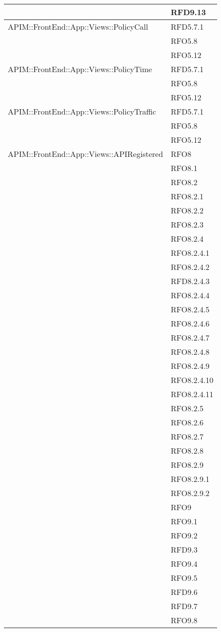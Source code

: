 \begin{longtable}{ p{12cm} | p{4cm} }
	& RFD9.13 \\
	\hline
	APIM::FrontEnd::App::Views::PolicyCall
	& RFD5.7.1 \\
	& RFO5.8 \\
	& RFO5.12 \\
	\hline
	APIM::FrontEnd::App::Views::PolicyTime
	& RFD5.7.1 \\
	& RFO5.8 \\
	& RFO5.12 \\
	\hline
	APIM::FrontEnd::App::Views::PolicyTraffic
	& RFD5.7.1 \\
	& RFO5.8 \\
	& RFO5.12 \\
	\hline
	APIM::FrontEnd::App::Views::APIRegistered
	& RFO8 \\
	& RFO8.1 \\
	& RFO8.2 \\
	& RFO8.2.1 \\
	& RFO8.2.2 \\
	& RFO8.2.3 \\
	& RFO8.2.4 \\
	& RFO8.2.4.1 \\
	& RFO8.2.4.2 \\
	& RFD8.2.4.3 \\
	& RFO8.2.4.4 \\
	& RFO8.2.4.5 \\
	& RFO8.2.4.6 \\
	& RFO8.2.4.7 \\
	& RFO8.2.4.8 \\
	& RFO8.2.4.9 \\
	& RFO8.2.4.10 \\
	& RFO8.2.4.11 \\
	& RFO8.2.5 \\
	& RFO8.2.6 \\
	& RFO8.2.7 \\
	& RFO8.2.8 \\
	& RFO8.2.9 \\
	& RFO8.2.9.1 \\
	& RFO8.2.9.2 \\
	& RFO9 \\
	& RFO9.1 \\
	& RFO9.2 \\
	& RFD9.3 \\
	& RFO9.4 \\
	& RFO9.5 \\
	& RFD9.6 \\
	& RFD9.7 \\
	& RFO9.8 \\

\end{longtable}
